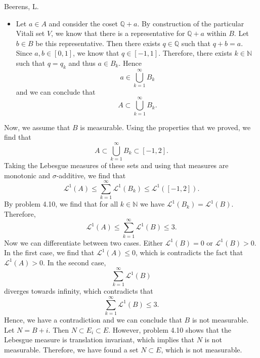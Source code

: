 \begin{solution}[4.8]{Beerens, L.}
\begin{itemize}
        \item Let $a\in A$ and consider the coset $\mathbb{Q} + a$. By construction of the particular Vitali set $V$, we know that there is a representative for $\mathbb{Q} + a$ within $B$. Let $b\in B$ be this representative. Then there exists $q\in\mathbb{Q}$ such that $q+b =a$. Since $a,b\in [0,1]$, we know that $q\in[-1,1]$. Therefore, there exists $k\in\mathbb{N}$ such that $q=q_k$ and thus $a\in B_k$. Hence 
        $$
            a\in\bigcup_{k=1}^\infty B_k
        $$
        and we can conclude that
        $$
            A\subset\bigcup_{k=1}^\infty B_k.
        $$
    \end{itemize}
    Now, we assume that $B$ is measurable. Using the properties that we proved, we find that
    $$
        A\subset\bigcup_{k=1}^\infty B_k\subset[-1,2].
    $$
    Taking the Lebesgue measures of these sets and using that measures are monotonic and $\sigma$-additive, we find that
    $$
        \mathcal{L}^1(A) \leq \sum_{k=1}^\infty \mathcal{L}^1(B_k)\leq \mathcal{L}^1([-1,2]).
    $$
    By problem 4.10, we find that for all $k\in\mathbb{N}$ we have $\mathcal{L}^1(B_k) = \mathcal{L}^1(B)$. Therefore,
    $$
        \mathcal{L}^1(A) \leq \sum_{k=1}^\infty \mathcal{L}^1(B)\leq 3.
    $$
    Now we can differentiate between two cases. Either $\mathcal{L}^1(B)=0$ or $\mathcal{L}^1(B)>0$. In the first case, we find that $\mathcal{L}^1(A) \leq 0$, which is contradicts the fact that $\mathcal{L}^1(A) > 0$. In the second case,
    $$
        \sum_{k=1}^\infty \mathcal{L}^1(B)
    $$
    diverges towards infinity, which contradicts that
    $$
        \sum_{k=1}^\infty \mathcal{L}^1(B)\leq 3.
    $$
    Hence, we have a contradiction and we can conclude that $B$ is not measurable. Let $N = B + i$. Then $N\subset E_i\subset E$. However, problem 4.10 shows that the Lebesgue measure is translation invariant, which implies that $N$ is not measurable. Therefore, we have found a set $N\subset E$, which is not measurable.
\end{solution}

